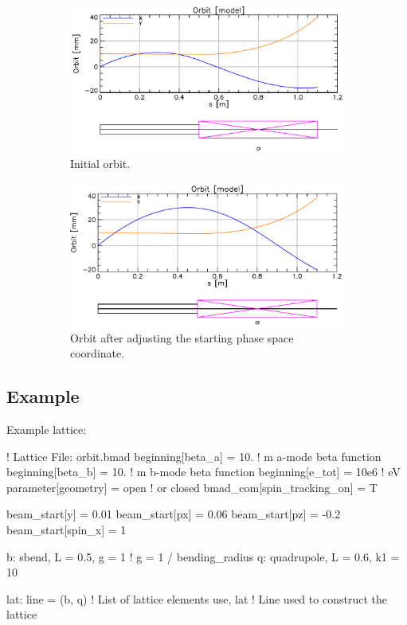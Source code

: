 \documentclass{hitec}
\begin{document}
\begin{figure}[tb]
  \centering
  \begin{subfigure}[b]{0.48\textwidth}
    \includegraphics[width=\textwidth]{phase0.pdf}
    \caption{Initial orbit.}
    \label{f:phase0}
  \end{subfigure}
  \hfil
  \begin{subfigure}[b]{0.48\textwidth}
    \includegraphics[width=\textwidth]{phase1.pdf}
    \caption{Orbit after adjusting the starting  phase space coordinate.}
    \label{f:phase1}
  \end{subfigure}
  \caption{}
\end{figure}

\subsection{Example}

Example lattice:
\begin{code}
! Lattice File: orbit.bmad
beginning[beta_a] = 10.   ! m  a-mode beta function
beginning[beta_b] = 10.   ! m  b-mode beta function
beginning[e_tot] = 10e6   ! eV
parameter[geometry] = open  ! or closed
bmad_com[spin_tracking_on] = T

beam_start[y] = 0.01
beam_start[px] = 0.06
beam_start[pz] = -0.2
beam_start[spin_x] = 1

b: sbend, L = 0.5, g = 1    ! g = 1 / bending_radius
q: quadrupole, L = 0.6, k1 = 10

lat: line = (b, q)   ! List of lattice elements
use, lat                ! Line used to construct the lattice
\end{code}
\end{document}
